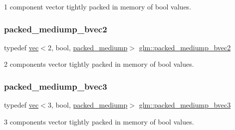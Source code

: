 1 component vector tightly packed in memory of bool values. 

\mbox{\label{group__gtc__type__aligned_ga5c9715603d1138006760556f02aacad5}} 
\subsubsection{\texorpdfstring{packed\+\_\+mediump\+\_\+bvec2}{packed\_mediump\_bvec2}}
{\footnotesize\ttfamily typedef \mbox{\hyperlink{structglm_1_1vec}{vec}}$<$2, bool, \mbox{\hyperlink{namespaceglm_a36ed105b07c7746804d7fdc7cc90ff25a9604654c3b137cd7898689fd34b25bc0}{packed\+\_\+mediump}}$>$ \mbox{\hyperlink{group__gtc__type__aligned_ga5c9715603d1138006760556f02aacad5}{glm\+::packed\+\_\+mediump\+\_\+bvec2}}}



2 components vector tightly packed in memory of bool values. 

\mbox{\label{group__gtc__type__aligned_ga5680ac66be8ba6f8bc6725553d4e8723}} 
\subsubsection{\texorpdfstring{packed\+\_\+mediump\+\_\+bvec3}{packed\_mediump\_bvec3}}
{\footnotesize\ttfamily typedef \mbox{\hyperlink{structglm_1_1vec}{vec}}$<$3, bool, \mbox{\hyperlink{namespaceglm_a36ed105b07c7746804d7fdc7cc90ff25a9604654c3b137cd7898689fd34b25bc0}{packed\+\_\+mediump}}$>$ \mbox{\hyperlink{group__gtc__type__aligned_ga5680ac66be8ba6f8bc6725553d4e8723}{glm\+::packed\+\_\+mediump\+\_\+bvec3}}}



3 components vector tightly packed in memory of bool values. 

\mbox{\label{group__gtc__type__aligned_gad50db2a2ae76ec64785b9d87cd2dfb2c}} 
